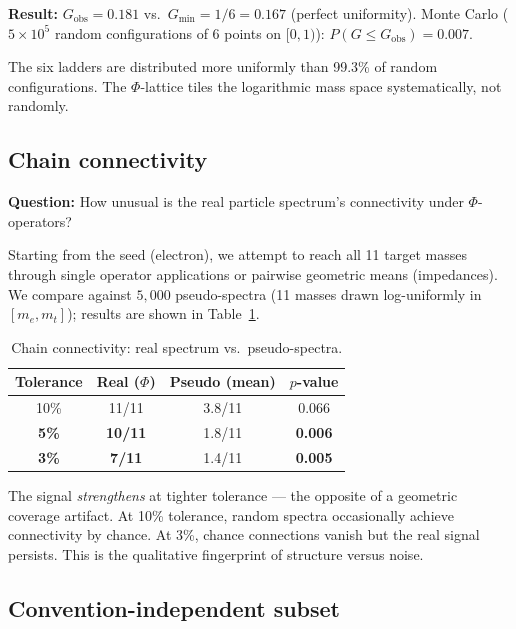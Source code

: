 \documentclass[11pt,a4paper]{article}
\begin{document}
\noindent
\textbf{Result:}
$G_\text{obs} = 0.181$ vs.\ $G_\text{min} = 1/6 = 0.167$ (perfect uniformity).
Monte Carlo ($5 \times 10^5$ random configurations of 6 points on
$[0,1)$): $P(G \leq G_\text{obs}) = 0.007$.

The six ladders are distributed more uniformly than 99.3\% of random
configurations. The $\Phi$-lattice tiles the logarithmic mass space
systematically, not randomly.

\subsection{Chain connectivity}
\label{sec:connectivity}

\textbf{Question:} How unusual is the real particle spectrum's
connectivity under $\Phi$-operators?

Starting from the seed (electron), we attempt to reach all 11 target
masses through single operator applications or pairwise geometric
means (impedances). We compare against $5{,}000$ pseudo-spectra
(11 masses drawn log-uniformly in $[m_e, m_t]$); results are shown
in Table~\ref{tab:connectivity}.

\begin{table}[H]
\centering
\caption{Chain connectivity: real spectrum vs.\ pseudo-spectra.}
\label{tab:connectivity}
\begin{tabular}{@{}cccc@{}}
\toprule
Tolerance & Real ($\Phi$) & Pseudo (mean) & $p$-value \\
\midrule
10\% & 11/11 & 3.8/11 & 0.066 \\
\textbf{5\%}  & \textbf{10/11} & 1.8/11 & \textbf{0.006} \\
\textbf{3\%}  & \textbf{7/11}  & 1.4/11 & \textbf{0.005} \\
\bottomrule
\end{tabular}
\end{table}

\noindent
The signal \emph{strengthens} at tighter tolerance --- the opposite
of a geometric coverage artifact. At 10\% tolerance, random spectra
occasionally achieve connectivity by chance. At 3\%, chance connections
vanish but the real signal persists. This is the qualitative
fingerprint of structure versus noise.

\subsection{Convention-independent subset}
\label{sec:convindep}
\end{document}
